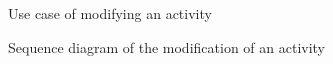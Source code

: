 \documentclass[12pt,titlepage]{article}
\begin{document}
\pagebreak 
\begin{figure}
\centering
{}
\caption{Use case of modifying an activity}

\end{figure}
\begin{figure}
\centering
{} 
\caption{Sequence diagram of the modification of an activity}
\end{figure}
\clearpage
\newpage
\end{document}
